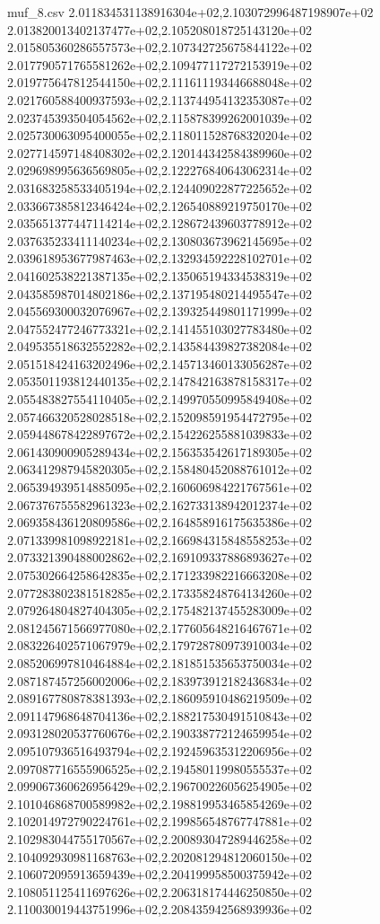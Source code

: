 \begin{filecontents*}{muf_8.csv}
2.011834531138916304e+02,2.103072996487198907e+02
2.013820013402137477e+02,2.105208018725143120e+02
2.015805360286557573e+02,2.107342725675844122e+02
2.017790571765581262e+02,2.109477117272153919e+02
2.019775647812544150e+02,2.111611193446688048e+02
2.021760588400937593e+02,2.113744954132353087e+02
2.023745393504054562e+02,2.115878399262001039e+02
2.025730063095400055e+02,2.118011528768320204e+02
2.027714597148408302e+02,2.120144342584389960e+02
2.029698995636569805e+02,2.122276840643062314e+02
2.031683258533405194e+02,2.124409022877225652e+02
2.033667385812346424e+02,2.126540889219750170e+02
2.035651377447114214e+02,2.128672439603778912e+02
2.037635233411140234e+02,2.130803673962145695e+02
2.039618953677987463e+02,2.132934592228102701e+02
2.041602538221387135e+02,2.135065194334538319e+02
2.043585987014802186e+02,2.137195480214495547e+02
2.045569300032076967e+02,2.139325449801171999e+02
2.047552477246773321e+02,2.141455103027783480e+02
2.049535518632552282e+02,2.143584439827382084e+02
2.051518424163202496e+02,2.145713460133056287e+02
2.053501193812440135e+02,2.147842163878158317e+02
2.055483827554110405e+02,2.149970550995849408e+02
2.057466320528028518e+02,2.152098591954472795e+02
2.059448678422897672e+02,2.154226255881039833e+02
2.061430900905289434e+02,2.156353542617189305e+02
2.063412987945820305e+02,2.158480452088761012e+02
2.065394939514885095e+02,2.160606984221767561e+02
2.067376755582961323e+02,2.162733138942012374e+02
2.069358436120809586e+02,2.164858916175635386e+02
2.071339981098922181e+02,2.166984315848558253e+02
2.073321390488002862e+02,2.169109337886893627e+02
2.075302664258642835e+02,2.171233982216663208e+02
2.077283802381518285e+02,2.173358248764134260e+02
2.079264804827404305e+02,2.175482137455283009e+02
2.081245671566977080e+02,2.177605648216467671e+02
2.083226402571067979e+02,2.179728780973910034e+02
2.085206997810464884e+02,2.181851535653750034e+02
2.087187457256002006e+02,2.183973912182436834e+02
2.089167780878381393e+02,2.186095910486219509e+02
2.091147968648704136e+02,2.188217530491510843e+02
2.093128020537760676e+02,2.190338772124659954e+02
2.095107936516493794e+02,2.192459635312206956e+02
2.097087716555906525e+02,2.194580119980555537e+02
2.099067360626956429e+02,2.196700226056254905e+02
2.101046868700589982e+02,2.198819953465854269e+02
2.102014972790224761e+02,2.199856548767747881e+02
2.102983044755170567e+02,2.200893047289446258e+02
2.104092930981168763e+02,2.202081294812060150e+02
2.106072095913659439e+02,2.204199958500375942e+02
2.108051125411697626e+02,2.206318174446250850e+02
2.110030019443751996e+02,2.208435942568939936e+02

\end{filecontents*}
